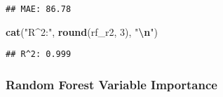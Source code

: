 \documentclass[
]{article}
\newenvironment{Shaded}{\begin{snugshade}}{\end{snugshade}}
\newcommand{\DecValTok}[1]{\textcolor[rgb]{0.00,0.00,0.81}{#1}}
\newcommand{\FunctionTok}[1]{\textcolor[rgb]{0.13,0.29,0.53}{\textbf{#1}}}
\newcommand{\NormalTok}[1]{#1}
\newcommand{\SpecialCharTok}[1]{\textcolor[rgb]{0.81,0.36,0.00}{\textbf{#1}}}
\newcommand{\StringTok}[1]{\textcolor[rgb]{0.31,0.60,0.02}{#1}}
\begin{document}
\begin{verbatim}
## MAE: 86.78
\end{verbatim}

\begin{Shaded}
\begin{Highlighting}[]
\FunctionTok{cat}\NormalTok{(}\StringTok{"R\^{}2:"}\NormalTok{, }\FunctionTok{round}\NormalTok{(rf\_r2, }\DecValTok{3}\NormalTok{), }\StringTok{"}\SpecialCharTok{\textbackslash{}n}\StringTok{"}\NormalTok{)}
\end{Highlighting}
\end{Shaded}

\begin{verbatim}
## R^2: 0.999
\end{verbatim}

\subsubsection{Random Forest Variable
Importance}\label{random-forest-variable-importance}
\end{document}
